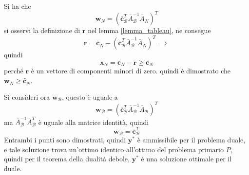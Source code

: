 \documentclass[10pt, letterpaper]{report}
\begin{document}
Si ha che $$ 
\mathbf w_N=( \bar {\mathbf c}^T_{\mathcal{B}}\bar A^{-1}_{\mathcal B}\bar A_N)^T
$$
si osservi la definizione di $\mathbf r$ nel lemma \ref{lemma_tableau}, ne consegue 
$$ \mathbf r = \bar{\mathbf c}_N-( \bar {\mathbf c}^T_{\mathcal{B}}\bar A^{-1}_{\mathcal B}\bar A_N)^T \implies  $$
quindi 
$$ \mathbf x_N=\bar{\mathbf c}_N-\mathbf r \ge  \bar{\mathbf c}_N $$
perché $\mathbf r$ è un vettore di componenti minori di zero. quindi è dimostrato che  $\mathbf w_N \ge \bar{\mathbf c}_N$.\bigskip

Si consideri ora  $\mathbf w_{\mathcal B}$, questo è uguale a 
$$ \mathbf w_{\mathcal B} = ( \bar {\mathbf c}^T_{\mathcal{B}}\bar A^{-1}_{\mathcal B}\bar A_{\mathcal B})^T$$
ma $\bar A^{-1}_{\mathcal B}\bar A_{\mathcal B}^T$ è uguale alla matrice identità, quindi 
$$ \mathbf w_{\mathcal B} =\bar {\mathbf c}^T_{\mathcal{B}}$$
Entrambi i punti sono dimostrati, quindi $\mathbf y^*$ è ammissibile per il problema duale, e tale soluzione trova un'ottimo identico all'ottimo del problema primario $P$, quindi per il teorema della dualità debole,  $\mathbf y^*$ è una soluzione ottimale per il duale.
\end{document}
